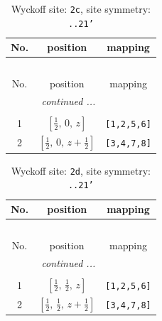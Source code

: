 \documentclass[fleqn,8pt]{jsarticle}
\begin{document}
\begin{longtable}{ccc}
\caption{Wyckoff site: {\tt 2c}, site symmetry: {\tt ..21'}}
 \\
 \hline \hline
No. & position & mapping \\ \hline \endfirsthead

\multicolumn{2}{l}{\tablename\ \thetable{}} \\
 \hline \hline
No. & position & mapping \\ \hline \endhead

 \hline \hline
\multicolumn{2}{r}{\footnotesize\it continued ...} \\ \endfoot

 \hline \hline
\multicolumn{2}{r}{} \\ \endlastfoot

1 & $\left[ \frac{1}{2},\, 0,\, z \right]$ & {\tt [1,2,5,6]} \\ \hline
2 & $\left[ \frac{1}{2},\, 0,\, z + \frac{1}{2} \right]$ & {\tt [3,4,7,8]} \\
\end{longtable}
\renewcommand{\arraystretch}{1.2}
\begin{longtable}{ccc}
\caption{Wyckoff site: {\tt 2d}, site symmetry: {\tt ..21'}}
 \\
 \hline \hline
No. & position & mapping \\ \hline \endfirsthead

\multicolumn{2}{l}{\tablename\ \thetable{}} \\
 \hline \hline
No. & position & mapping \\ \hline \endhead

 \hline \hline
\multicolumn{2}{r}{\footnotesize\it continued ...} \\ \endfoot

 \hline \hline
\multicolumn{2}{r}{} \\ \endlastfoot

1 & $\left[ \frac{1}{2},\, \frac{1}{2},\, z \right]$ & {\tt [1,2,5,6]} \\ \hline
2 & $\left[ \frac{1}{2},\, \frac{1}{2},\, z + \frac{1}{2} \right]$ & {\tt [3,4,7,8]} \\
\end{longtable}
\renewcommand{\arraystretch}{1.2}
\end{document}
